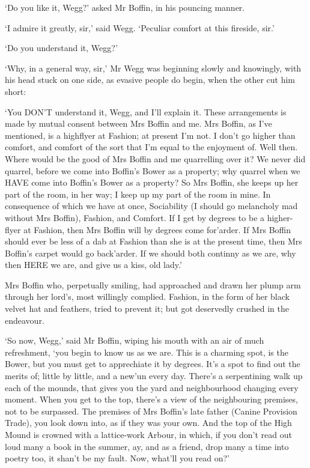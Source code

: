 ‘Do you like it, Wegg?’ asked Mr Boffin, in his pouncing manner.

‘I admire it greatly, sir,’ said Wegg. ‘Peculiar comfort at this
fireside, sir.’

‘Do you understand it, Wegg?’

‘Why, in a general way, sir,’ Mr Wegg was beginning slowly and
knowingly, with his head stuck on one side, as evasive people do begin,
when the other cut him short:

‘You DON’T understand it, Wegg, and I’ll explain it. These arrangements
is made by mutual consent between Mrs Boffin and me. Mrs Boffin, as I’ve
mentioned, is a highflyer at Fashion; at present I’m not. I don’t go
higher than comfort, and comfort of the sort that I’m equal to the
enjoyment of. Well then. Where would be the good of Mrs Boffin and me
quarrelling over it? We never did quarrel, before we come into Boffin’s
Bower as a property; why quarrel when we HAVE come into Boffin’s Bower
as a property? So Mrs Boffin, she keeps up her part of the room, in her
way; I keep up my part of the room in mine. In consequence of which
we have at once, Sociability (I should go melancholy mad without Mrs
Boffin), Fashion, and Comfort. If I get by degrees to be a higher-flyer
at Fashion, then Mrs Boffin will by degrees come for’arder. If Mrs
Boffin should ever be less of a dab at Fashion than she is at the
present time, then Mrs Boffin’s carpet would go back’arder. If we should
both continny as we are, why then HERE we are, and give us a kiss, old
lady.’

Mrs Boffin who, perpetually smiling, had approached and drawn her plump
arm through her lord’s, most willingly complied. Fashion, in the form
of her black velvet hat and feathers, tried to prevent it; but got
deservedly crushed in the endeavour.

‘So now, Wegg,’ said Mr Boffin, wiping his mouth with an air of much
refreshment, ‘you begin to know us as we are. This is a charming spot,
is the Bower, but you must get to apprechiate it by degrees. It’s a spot
to find out the merits of; little by little, and a new’un every day.
There’s a serpentining walk up each of the mounds, that gives you the
yard and neighbourhood changing every moment. When you get to the top,
there’s a view of the neighbouring premises, not to be surpassed. The
premises of Mrs Boffin’s late father (Canine Provision Trade), you look
down into, as if they was your own. And the top of the High Mound is
crowned with a lattice-work Arbour, in which, if you don’t read out loud
many a book in the summer, ay, and as a friend, drop many a time into
poetry too, it shan’t be my fault. Now, what’ll you read on?’

